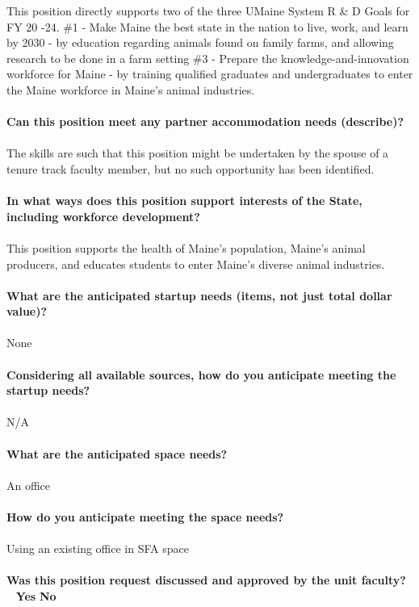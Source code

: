 \documentclass[11pt]{article}
\begin{document}
This position directly supports two of the three UMaine System R \& D Goals for FY 20 -24. 
\#1 - Make Maine the best state in the nation to live, work, and learn by 2030 - by education regarding animals found on family farms, and allowing research to be done in a farm setting
\#3 - Prepare the knowledge-and-innovation workforce for Maine - by training qualified graduates and undergraduates to enter the Maine workforce in Maine's animal industries.\\~\\
\vfill
\noindent\textbf{\rmfamily Can this position meet any partner accommodation needs (describe)?}\\~\\
The skills are such that this position might be undertaken by the spouse of a tenure track faculty member, but no such opportunity has been identified.\\~\\
\vfill
\noindent\textbf{\rmfamily In what ways does this position support interests of the State, including workforce development?}\\~\\
This position supports the health of Maine's population, Maine's animal producers, and educates students to enter Maine's diverse animal industries.\\~\\
\vfill
\newpage\noindent\textbf{\rmfamily What are the anticipated startup needs (items, not just total dollar value)?}\\~\\
None\\~\\
\vfill
\noindent\textbf{\rmfamily Considering all available sources, how do you anticipate meeting the startup needs?}\\~\\
N/A\\~\\
\vfill
\noindent\textbf{\rmfamily What are the anticipated space needs?}\\~\\
An office\\~\\
\vfill
\noindent\textbf{\rmfamily How do you anticipate meeting the space needs?} \\~\\
Using an existing office in SFA space\\~\\
\vfill
\noindent\textbf{\rmfamily Was this position request discussed and approved by the unit faculty?} \hfill ~ \hfill \textbf{\Large{\HollowBox} \normalsize{Yes}} \hfill \textbf{\Large{\HollowBox} \normalsize{ No}}\\~\\%
\end{document}
